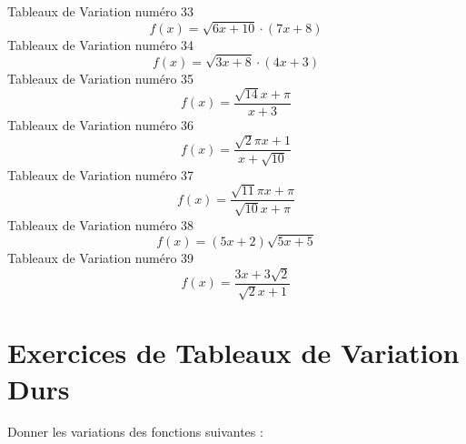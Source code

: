 \documentclass{article}
\begin{document}
\]Tableaux de Variation num\'ero 33 \[f(x) = \sqrt{6 x + 10} \cdot \left(7 x + 8\right)\]Tableaux de Variation num\'ero 34 \[f(x) = \sqrt{3 x + 8} \cdot \left(4 x + 3\right)\]Tableaux de Variation num\'ero 35 \[f(x) = \frac{\sqrt{14} x + \pi}{x + 3}\]Tableaux de Variation num\'ero 36 \[f(x) = \frac{\sqrt{2} \pi x + 1}{x + \sqrt{10}}\]Tableaux de Variation num\'ero 37 \[f(x) = \frac{\sqrt{11} \pi x + \pi}{\sqrt{10} x + \pi}\]Tableaux de Variation num\'ero 38 \[f(x) = \left(5 x + 2\right) \sqrt{5 x + 5}\]Tableaux de Variation num\'ero 39 \[f(x) = \frac{3 x + 3 \sqrt{2}}{\sqrt{2} x + 1}\]
 \section{Exercices de Tableaux de Variation Durs}

 Donner les variations des fonctions suivantes : 
\end{document}
